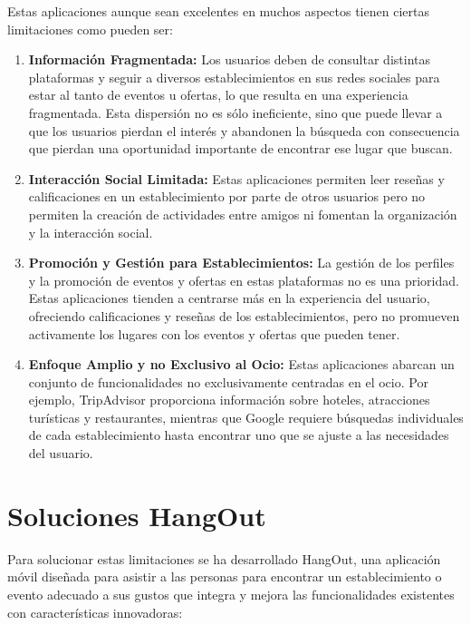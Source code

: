 Estas aplicaciones aunque sean excelentes en muchos aspectos tienen ciertas limitaciones como pueden ser:

\begin{enumerate}

    \item \textbf{Información Fragmentada:} Los usuarios deben de consultar distintas plataformas y seguir a
          diversos establecimientos en sus redes sociales para estar al tanto de eventos u ofertas, lo que resulta en una
          experiencia fragmentada. Esta dispersión no es sólo ineficiente, sino que puede llevar a que los usuarios
          pierdan el interés y abandonen la búsqueda con consecuencia que pierdan una oportunidad importante de encontrar
          ese lugar que buscan.

    \item \textbf{Interacción Social Limitada:} Estas aplicaciones permiten leer reseñas y calificaciones en un
          establecimiento por parte de otros usuarios pero no permiten la creación de actividades entre amigos ni fomentan
          la organización y la interacción social.

    \item \textbf{Promoción y Gestión para Establecimientos:} La gestión de los perfiles y la promoción de eventos y
          ofertas en estas plataformas no es una prioridad. Estas aplicaciones tienden a centrarse más en la experiencia
          del usuario, ofreciendo calificaciones y reseñas de los establecimientos, pero no promueven activamente los
          lugares con los eventos y ofertas que pueden tener.

    \item \textbf{Enfoque Amplio y no Exclusivo al Ocio:} Estas aplicaciones abarcan un conjunto de funcionalidades
          no exclusivamente centradas en el ocio. Por ejemplo, TripAdvisor proporciona información sobre hoteles,
          atracciones turísticas y restaurantes, mientras que Google requiere búsquedas individuales de cada
          establecimiento hasta encontrar uno que se ajuste a las necesidades del usuario.

\end{enumerate}

\section{Soluciones HangOut}

Para solucionar estas limitaciones se ha desarrollado HangOut, una aplicación móvil diseñada para asistir a las personas para encontrar un establecimiento o evento adecuado a sus gustos que integra y mejora las funcionalidades existentes con características innovadoras:


